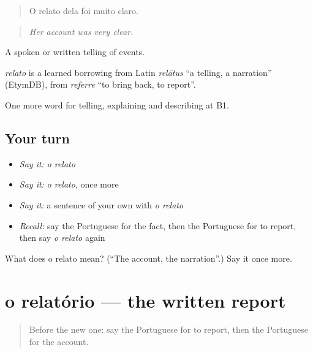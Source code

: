 \begin{quote}
O relato dela foi muito claro.
\end{quote}

\begin{quote}
\emph{Her account was very clear.}
\end{quote}

A spoken or written telling of events.

\begin{cousinweb}
\emph{relato} is a learned borrowing from Latin \emph{relātus} \textquotedblleft{}a telling, a narration\textquotedblright{} (EtymDB), from \emph{referre} \textquotedblleft{}to bring back, to report\textquotedblright{}.
\end{cousinweb}

\begin{grammarlens}[title={What you've built}]
One more word for telling, explaining and describing at B1.
\end{grammarlens}

\subsection*{Your turn}
\begin{itemize}
\raggedright
  \item \emph{Say it:} \emph{o relato}
  \item \emph{Say it:} \emph{o relato}, once more
  \item \emph{Say it:} a sentence of your own with \emph{o relato}
  \item \emph{Recall:} say the Portuguese for the fact, then the Portuguese for to report, then say \emph{o relato} again
\end{itemize}

\begin{tcolorbox}[breakable,colback=teal!4,colframe=teal!35!black,title={Before you move on}]
What does o relato mean? (\textquotedblleft{}The account, the narration\textquotedblright{}.) Say it once more.
\end{tcolorbox}
\section[o relatório]{o relatório — the written report}

\label{lesson:PT-C281-relatorio}



\begin{quote}
Before the new one: say the Portuguese for to report, then the Portuguese for the account.
\end{quote}

